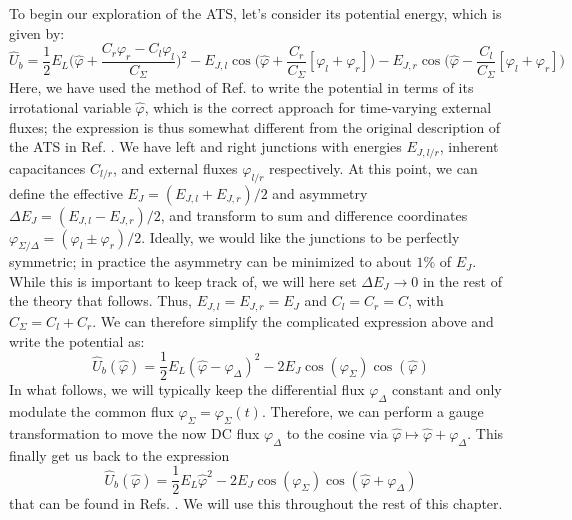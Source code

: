 \noindent To begin our exploration of the ATS, let's consider its potential energy, which is given by:
\begin{equation}
    \hat{U}_b = \frac{1}{2}E_L \bigg(\hat{\varphi} + \frac{C_r\varphi_r - C_l\varphi_l}{C_\Sigma}\bigg)^2 - E_{J,l}\cos\!\bigg(\hat{\varphi} + \frac{C_r}{C_\Sigma}[\varphi_l + \varphi_r]\bigg) - E_{J,r}\cos\!\bigg(\hat{\varphi} - \frac{C_l}{C_\Sigma}[\varphi_l + \varphi_r]\bigg)
\end{equation}
Here, we have used the method of Ref. \cite{you2019circuit} to write the potential in terms of its irrotational variable $\hat{\varphi}$, which is the correct approach for time-varying external fluxes; the expression is thus somewhat different from the original description of the ATS in Ref. \cite{lescanne2020exponential}. We have left and right junctions with energies $E_{J, l/r}$, inherent capacitances $C_{l/r}$, and external fluxes $\varphi_{l/r}$ respectively. At this point, we can define the effective $E_J = (E_{J,l} + E_{J,r})/2$ and asymmetry $\Delta E_J = (E_{J,l} - E_{J,r})/2$, and transform to sum and difference coordinates $\varphi_{\Sigma/\Delta} = (\varphi_l \pm \varphi_r)/2$.  Ideally, we would like the junctions to be perfectly symmetric; in practice the asymmetry can be minimized to about $1\%$ of $E_J$. While this is important to keep track of, we will here set $\Delta E_J \to 0$ in the rest of the theory that follows. Thus, $E_{J,l} = E_{J,r} = E_J$ and $C_l = C_r = C$, with $C_\Sigma = C_l + C_r$. We can therefore simplify the complicated expression above and write the potential as:
\begin{equation}
\hat{U}_b(\hat{\varphi}) = \frac{1}{2}E_L(\hat{\varphi} - \varphi_\Delta)^2 - 2E_J \cos(\varphi_\Sigma)\cos(\hat{\varphi})
\end{equation}
In what follows, we will typically keep the differential flux $\varphi_\Delta$ constant and only modulate the common flux $\varphi_\Sigma = \varphi_\Sigma(t)$. Therefore, we can perform a gauge transformation to move the now DC flux $\varphi_\Delta$ to the cosine via $\hat{\varphi} \mapsto \hat{\varphi} + \varphi_\Delta$. This finally get us back to the expression
\begin{equation}
\hat{U}_b(\hat{\varphi}) = \frac{1}{2}E_L\hat{\varphi}^2 - 2E_J \cos(\varphi_\Sigma)\cos(\hat{\varphi} + \varphi_\Delta)
\end{equation}
that can be found in Refs. \cite{lescanne2020exponential, berdou2023one}. We will use this throughout the rest of this chapter.

